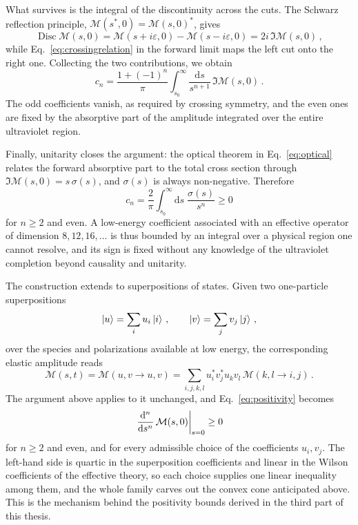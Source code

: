 What survives is the integral of the discontinuity across the cuts. The Schwarz reflection
principle, $\mathcal M(s^{*},0)=\mathcal M(s,0)^{*}$, gives
\begin{equation}
    \operatorname{Disc}\mathcal M(s,0) = \mathcal M(s+i\varepsilon,0)-\mathcal M(s-i\varepsilon,0)
    =2i\,\Im\mathcal M(s,0)\,,
\end{equation}
while Eq.~\eqref{eq:crossingrelation} in the forward limit maps the left cut onto the right one.
Collecting the two contributions, we obtain
\begin{equation}\label{eq:dispersion}
    c_n = \frac{1+(-1)^n}{\pi}\int_{s_0}^{\infty}\frac{\text{d}s}{s^{n+1}}\,\Im\mathcal M(s,0)\,.
\end{equation}
The odd coefficients vanish, as required by crossing symmetry, and the even ones are fixed by
the absorptive part of the amplitude integrated over the entire ultraviolet region.

Finally, unitarity closes the argument: the optical theorem in Eq.~\eqref{eq:optical} relates the forward
absorptive part to the total cross section through $\Im\mathcal M(s,0)=s\,\sigma(s)$, and $\sigma(s)$
is always non-negative. Therefore
\begin{equation}\label{eq:positivity}
    c_n = \frac{2}{\pi}\int_{s_0}^{\infty}\text{d}s\;\frac{\sigma(s)}{s^{n}} \ge 0
\end{equation}
for $n\ge 2$ and even.
A low-energy coefficient associated with an effective operator of dimension $8,12,16,\dotsc$ is thus bounded by an integral over a physical region one cannot resolve, and its
sign is fixed without any knowledge of the ultraviolet completion beyond causality and unitarity.

The construction extends to superpositions of states. Given two one-particle superpositions
\begin{equation}
    \ket{u}=\sum_i u_i\ket{i}\,,\qquad \ket{v}=\sum_j v_j\ket{j}\,,
\end{equation}
over the species and polarizations available at low energy, the corresponding elastic amplitude reads
\begin{equation}\label{eq:superposition}
    \mathcal M(s,t) = \mathcal M(u,v\to u,v)
    = \sum_{i,j,k,l} u_i^{*}v_j^{*}u_kv_l\,\mathcal M(k,l\to i,j)\,.
\end{equation}
The
argument above applies to it unchanged, and Eq.~\eqref{eq:positivity} becomes
\begin{equation}\label{eq:cone}
    \left.\dv[n]{}{s}\,\mathcal M(s,0)\right|_{s=0} \ge 0
\end{equation}
for $n\ge 2$ and even, and
for every admissible choice of the coefficients $u_i,v_j$. The
left-hand side is quartic in the superposition coefficients and linear in the Wilson coefficients of
the effective theory, so each choice supplies one linear inequality among them, and the whole family
carves out the convex cone anticipated above. This is the mechanism behind the positivity bounds
derived in the third part of this thesis.

